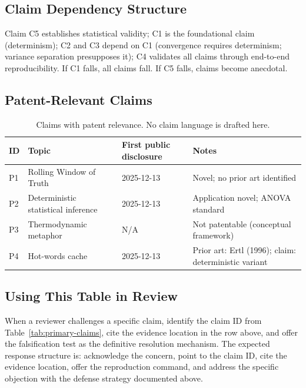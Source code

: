 \subsection{Claim Dependency Structure}

Claim C5 establishes statistical validity; C1 is the foundational claim
(determinism); C2 and C3 depend on C1 (convergence requires determinism;
variance separation presupposes it); C4 validates all claims through
end-to-end reproducibility. If C1 falls, all claims fall. If C5 falls,
claims become anecdotal.

\subsection{Patent-Relevant Claims}

\begin{table}[h]
\centering
\caption{Claims with patent relevance. No claim language is drafted here.}
\begin{tabular}{llll}
\toprule
\textbf{ID} & \textbf{Topic} & \textbf{First public disclosure} & \textbf{Notes} \\
\midrule
P1 & Rolling Window of Truth & 2025-12-13 & Novel; no prior art identified \\
P2 & Deterministic statistical inference & 2025-12-13 & Application novel; ANOVA standard \\
P3 & Thermodynamic metaphor & N/A & Not patentable (conceptual framework) \\
P4 & Hot-words cache & 2025-12-13 & Prior art: Ertl (1996); claim: deterministic variant \\
\bottomrule
\end{tabular}
\end{table}

\subsection{Using This Table in Review}

When a reviewer challenges a specific claim, identify the claim ID from
Table~\ref{tab:primary-claims}, cite the evidence location in the row above,
and offer the falsification test as the definitive resolution mechanism.
The expected response structure is: acknowledge the concern, point to the
claim ID, cite the evidence location, offer the reproduction command, and
address the specific objection with the defense strategy documented above.
